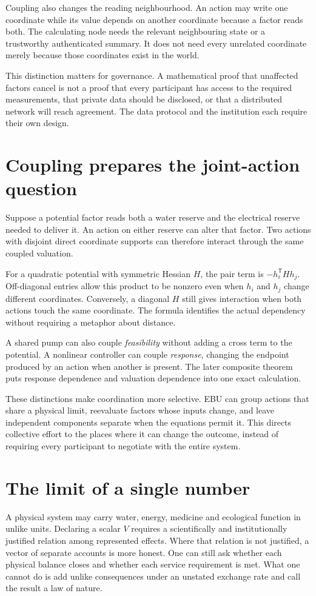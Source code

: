 Coupling also changes the reading neighbourhood. An action may write one coordinate while its value depends on another coordinate because a factor reads both. The calculating node needs the relevant neighbouring state or a trustworthy authenticated summary. It does not need every unrelated coordinate merely because those coordinates exist in the world.

This distinction matters for governance. A mathematical proof that unaffected factors cancel is not a proof that every participant has access to the required measurements, that private data should be disclosed, or that a distributed network will reach agreement. The data protocol and the institution each require their own design.

\section{Coupling prepares the joint-action question}
Suppose a potential factor reads both a water reserve and the electrical reserve needed to deliver it. An action on either reserve can alter that factor. Two actions with disjoint direct coordinate supports can therefore interact through the same coupled valuation.

For a quadratic potential with symmetric Hessian $H$, the pair term is $-h_i^{\mathsf T}Hh_j$. Off-diagonal entries allow this product to be nonzero even when $h_i$ and $h_j$ change different coordinates. Conversely, a diagonal $H$ still gives interaction when both actions touch the same coordinate. The formula identifies the actual dependency without requiring a metaphor about distance.

A shared pump can also couple \emph{feasibility} without adding a cross term to the potential. A nonlinear controller can couple \emph{response}, changing the endpoint produced by an action when another is present. The later composite theorem puts response dependence and valuation dependence into one exact calculation.

These distinctions make coordination more selective. EBU can group actions that share a physical limit, reevaluate factors whose inputs change, and leave independent components separate when the equations permit it. This directs collective effort to the places where it can change the outcome, instead of requiring every participant to negotiate with the entire system.

\section{The limit of a single number}
A physical system may carry water, energy, medicine and ecological function in unlike units. Declaring a scalar $V$ requires a scientifically and institutionally justified relation among represented effects. Where that relation is not justified, a vector of separate accounts is more honest. One can still ask whether each physical balance closes and whether each service requirement is met. What one cannot do is add unlike consequences under an unstated exchange rate and call the result a law of nature.

